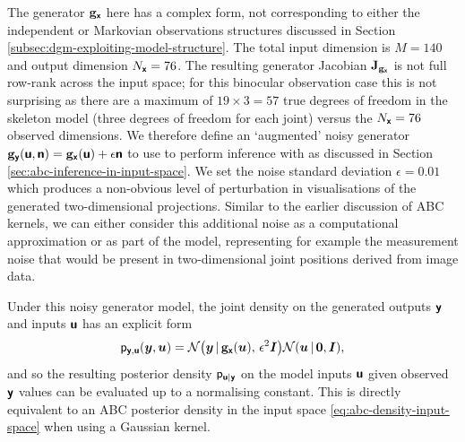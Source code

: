 The generator ${\mathbf{g}}_{\boldsymbol{\mathsf{x}}}$ here has a complex form, not corresponding to either the independent or Markovian observations structures discussed in Section \ref{subsec:dgm-exploiting-model-structure}. The total input dimension is $M=140$ and output dimension $N_{\boldsymbol{\mathsf{x}}} = 76$. The resulting generator Jacobian $\mathbf{J}_{{\mathbf{g}}_{\boldsymbol{\mathsf{x}}}}$ is not full row-rank across the input space; for this binocular observation case this is not surprising as there are a maximum of $19 \times 3 = 57$ true degrees of freedom in the skeleton model (three degrees of freedom for each joint) versus the $N_{\boldsymbol{\mathsf{x}}} = 76$ observed dimensions. We therefore define an `augmented' noisy generator ${\mathbf{g}}_{\boldsymbol{\mathsf{y}}}(\boldsymbol{\mathsf{u}},\boldsymbol{\mathsf{n}}) = {\mathbf{g}}_{\boldsymbol{\mathsf{x}}}(\boldsymbol{\mathsf{u}}) + \epsilon\boldsymbol{\mathsf{n}}$ to use to perform inference with as discussed in Section \ref{sec:abc-inference-in-input-space}. We set the noise standard deviation $\epsilon = 0.01$ which produces a non-obvious level of perturbation in visualisations of the generated two-dimensional projections. Similar to the earlier discussion of \ac{ABC} kernels, we can either consider this additional noise as a computational approximation or as part of the model, representing for example the measurement noise that would be present in two-dimensional joint positions derived from image data.

Under this noisy generator model, the joint density on the generated outputs $\boldsymbol{\mathsf{y}}$ and inputs $\boldsymbol{\mathsf{u}}$ has an explicit form
\begin{equation}
  \pden{\rvct{y},\rvct{u}}(\vct{y},\vct{u}) = 
  \nrm{\vct{y}\gvn\genfunc_{\rvct{x}}(\vct{u}),\,\epsilon^2 \mtx{I}}
  \nrm{\vct{u} \gvn \vct{0},\mtx{I}},
\end{equation}
and so the resulting posterior density $\mathsf{p}_{\boldsymbol{\mathsf{u}}|\boldsymbol{\mathsf{y}}}$ on the model inputs $\boldsymbol{\mathsf{u}}$ given observed $\boldsymbol{\mathsf{y}}$ values can be evaluated up to a normalising constant. This is directly equivalent to an \ac{ABC} posterior density in the input space \eqref{eq:abc-density-input-space} when using a Gaussian kernel.

